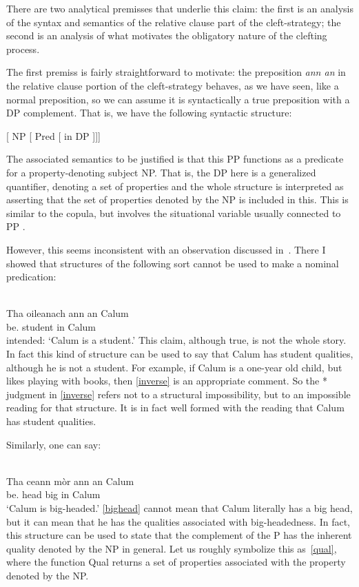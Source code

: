 \documentclass[output=paper]{langsci/langscibook}
\begin{document}
There are two analytical premisses that underlie this claim: the first is an analysis of the syntax and semantics of the relative clause part of the cleft-strategy; the second is an analysis of what motivates the obligatory nature of
the clefting process.

The first premiss is fairly straightforward to motivate: the preposition
\emph{ann an} in the relative clause portion of the cleft-strategy behaves, as
we have seen, like a normal preposition, so we can assume it is syntactically a
true preposition with a DP complement. That is, we have the following syntactic
structure:

\ea {}[ NP [ Pred [ in DP ]]] \z

The associated semantics to be justified is that this PP functions as a
predicate for a property-denoting subject NP. That is, the DP here is a
generalized quantifier, denoting a set of properties and the whole structure is
interpreted as asserting that the set of properties denoted by the NP is
included in this. This is similar to the copula, but involves the situational
variable usually connected to PP .

However, this seems inconsistent with an observation discussed
in~. There I showed that structures of the following sort
cannot be used to make a nominal predication:

\ea {}\\
    \gll * Tha oileanach {ann an} Calum\\
         {} be.\Prs{} student in Calum\\
\glt    {} intended: `Calum is a student.'\label{inverse}
\z
This claim, although true, is not the whole story. In fact this kind
of structure can be used to say that Calum has student qualities, although he
is not a student. For example, if Calum is a one-year old child, but likes
playing with books, then \eqref{inverse} is an appropriate comment. So the * judgment in \eqref{inverse} refers not to a structural impossibility, but to an impossible reading for that structure. It is in fact well formed with the reading that Calum has student qualities.

Similarly, one can say:

\ea {} \label{bighead}\\
\gll  Tha ceann m\`or {ann an} Calum\\
be.\Prs{} head big in Calum\\
\glt  `Calum is big-headed.'
\z
\eqref{bighead} cannot mean that Calum literally has a big head, but it can mean
that he has the qualities associated with big-headedness. In fact, this
structure can be used to state that the complement of the P has the inherent
quality denoted by the NP in general. Let us roughly symbolize this
as~\eqref{qual}, where the function Qual returns a set of properties associated
with the property denoted by the NP.
\end{document}

